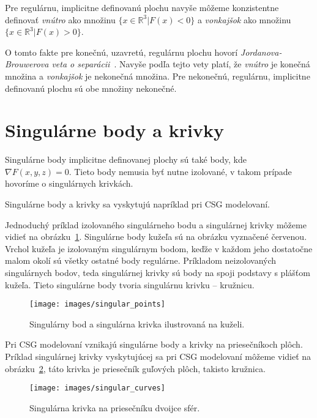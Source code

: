 Pre regulárnu, implicitne definovanú plochu navyše môžeme konzistentne definovať \textit{vnútro}
ako množinu $\{x \in \mathbb{R}^3 | F(x)<0 \}$ a \textit{vonkajšok} ako množinu 
$\{x \in \mathbb{R}^3 | F(x)>0 \}$.

O tomto fakte pre konečnú, uzavretú, regulárnu plochu hovorí 
\textit{Jordanova-Brouwerova veta o separácii}~\cite{montiel2009curves}. Navyše podľa tejto 
vety platí, že \textit{vnútro} je konečná množina a \textit{vonkajšok} je nekonečná množina. 
Pre nekonečnú, regulárnu, implicitne definovanú plochu sú obe množiny nekonečné. 


\section{Singulárne body a krivky}

Singulárne body implicitne definovanej plochy sú také body, kde $\nabla F(x, y, z) = 0$. Tieto body nemusia byť nutne izolované, 
v takom prípade hovoríme o singulárnych krivkách. 

Singulárne body a krivky sa vyskytujú napríklad pri CSG modelovaní. 

Jednoduchý príklad izolovaného singulárneho bodu a 
singulárnej krivky môžeme vidieť na obrázku~\ref{obr:singular_points}. Singulárne
body kužeľa sú na obrázku vyznačené červenou. Vrchol kužeľa je izolovaným singulárnym bodom, keďže v 
každom jeho dostatočne malom okolí sú všetky ostatné body regulárne. Príkladom neizolovaných singulárnych
bodov, teda singulárnej krivky sú body na spoji podstavy s plášťom kužeľa. Tieto singulárne body tvoria 
singulárnu krivku -- kružnicu.

\begin{figure}
    \centerline{\texttt{[image: images/singular\_points]}}
    \caption[Singulárny bod a singulárna krivka]
    {Singulárny bod a singulárna krivka ilustrovaná na kuželi.}
    \label{obr:singular_points}
\end{figure}

Pri CSG modelovaní vznikajú singulárne body a krivky na priesečníkoch plôch. Príklad
singulárnej krivky vyskytujúcej sa pri CSG modelovaní môžeme vidieť na obrázku~\ref{obr:singular_curves}, 
táto krivka je priesečník guľových plôch, takisto kružnica.

\begin{figure}
    \centerline{\texttt{[image: images/singular\_curves]}}
    \caption[Singulárna krivka na priesečníku dvoijce sfér]
    {Singulárna krivka na priesečníku dvoijce sfér.}
    \label{obr:singular_curves}
\end{figure}